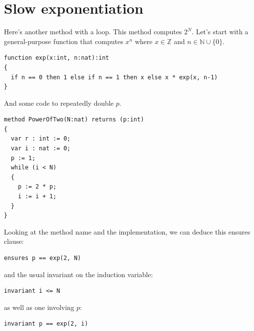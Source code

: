 \documentclass[11pt]{article}
\begin{document}
\section*{Slow exponentiation}
Here's another method with a loop. This method computes $2^N$.
Let's start with a general-purpose function that computes $x^n$
where $x \in \mathbb{Z}$ and $n \in \mathbb{N} \cup \{ 0 \}$.

\begin{lstlisting}[language=dafny]
function exp(x:int, n:nat):int
{
  if n == 0 then 1 else if n == 1 then x else x * exp(x, n-1)
}
\end{lstlisting}

And some code to repeatedly double $p$.
\begin{lstlisting}[language=dafny]
method PowerOfTwo(N:nat) returns (p:int)
{
  var r : int := 0;
  var i : nat := 0;
  p := 1;
  while (i < N)
  {
    p := 2 * p;
    i := i + 1;
  }
}
\end{lstlisting}

Looking at the method name and the implementation, we can deduce
this \textsf{ensures} clause:
\begin{lstlisting}[language=dafny]
  ensures p == exp(2, N)
\end{lstlisting}
and the usual invariant on the induction variable:
\begin{lstlisting}[language=dafny]
  invariant i <= N
\end{lstlisting}
as well as one involving $p$:
\begin{lstlisting}[language=dafny]
  invariant p == exp(2, i)
\end{lstlisting}
\end{document}
